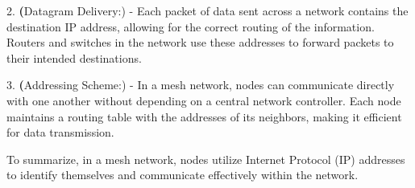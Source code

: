 2. \textbf(Datagram Delivery:)
   - Each packet of data sent across a network contains the destination IP address, allowing for the correct routing of the information. Routers and switches in the network use these addresses to forward packets to their intended destinations.

3. \textbf(Addressing Scheme:)
   - In a mesh network, nodes can communicate directly with one another without depending on a central network controller. Each node maintains a routing table with the addresses of its neighbors, making it efficient for data transmission.

To summarize, in a mesh network, nodes utilize Internet Protocol (IP) addresses to identify themselves and communicate effectively within the network.

